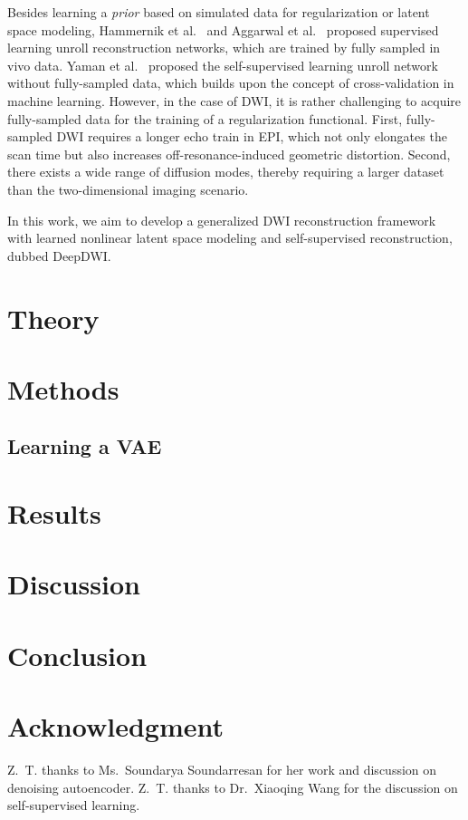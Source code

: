 \documentclass[journal,twoside,web]{ieeecolor}
\begin{document}
	Besides learning a \textit{prior} based on simulated data
	for regularization or latent space modeling,
	Hammernik et al.~\cite{hammernik_2018_varnet} and
	Aggarwal et al.~\cite{aggarwal_2018_modl}
	proposed supervised learning unroll reconstruction networks,
	which are trained by fully sampled in vivo data.
	Yaman et al.~\cite{yaman_2020_ssdu,yaman_2022_zs}
	proposed the self-supervised learning unroll network
	without fully-sampled data,
	which builds upon the concept of cross-validation in machine learning.
	However, in the case of DWI,
	it is rather challenging to acquire fully-sampled data
	for the training of a regularization functional.
	First, fully-sampled DWI requires a longer echo train in EPI,
	which not only elongates the scan time
	but also increases off-resonance-induced geometric distortion.
	Second, there exists a wide range of diffusion modes,
	thereby requiring a larger dataset than the two-dimensional imaging scenario.

	In this work, we aim to develop a generalized DWI reconstruction framework
	with learned nonlinear latent space modeling and self-supervised reconstruction,
	dubbed DeepDWI.



	\section{Theory}


	\section{Methods}

	\subsection{Learning a VAE}


	\section{Results}


	\section{Discussion}


	\section{Conclusion}


	\section*{Acknowledgment}

	Z.~T. thanks to Ms.~Soundarya Soundarresan for
	her work and discussion on denoising autoencoder.
	Z.~T. thanks to Dr.~Xiaoqing Wang for
	the discussion on self-supervised learning.

	
	
\end{document}
